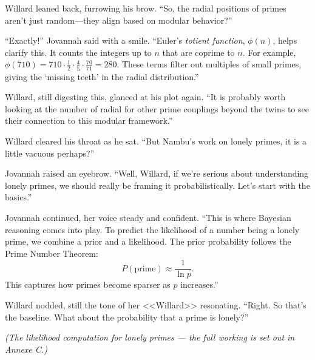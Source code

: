 Willard leaned back, furrowing his brow. “So, the radial positions of primes aren’t just random—they align based on modular behavior?”
\bigskip

“Exactly!” Jovannah said with a smile. “Euler’s \emph{totient function}, \( \phi(n) \), helps clarify this. It counts the integers up to \( n \) that are coprime to \( n \). For example, \( \phi(710) = 710 \cdot \frac{1}{2} \cdot \frac{4}{5} \cdot \frac{70}{71} = 280 \). These terms filter out multiples of small primes, giving the ‘missing teeth’ in the radial distribution.”
\bigskip

Willard, still digesting this, glanced at his plot again. “It is probably worth looking at the number of radial for other prime couplings beyond the twins to see their connection to this modular framework.”


Willard cleared his throat as he sat. “But Nambu’s work on lonely primes, it is a little vacuous perhaps?”
\bigskip

Jovannah raised an eyebrow. “Well, Willard, if we’re serious about understanding lonely primes, we should really be framing it probabilistically. Let’s start with the basics.”

\bigskip

Jovannah continued, her voice steady and confident. “This is where Bayesian reasoning comes into play. To predict the likelihood of a number being a lonely prime, we combine a prior and a likelihood. The prior probability follows the Prime Number Theorem:
\[
P(\text{prime}) \approx \frac{1}{\ln p}.
\]
This captures how primes become sparser as \( p \) increases.”
\bigskip

Willard nodded, still the tone of her <<Willard>> resonating. “Right. So that’s the baseline. What about the probability that a prime is lonely?”

\textit{(The likelihood computation for lonely primes --- the full working is set out in Annexe C.)}

